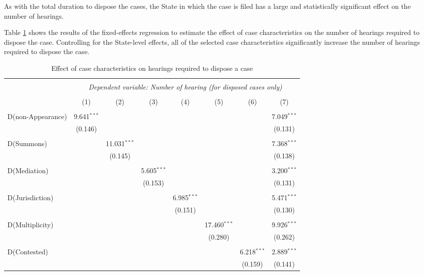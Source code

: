 As with the total duration to dispose the cases, the State in which the case is filed has a large and statistically significant effect on the number of hearings. 


Table \ref{tab:hearings_regression} shows the results of the fixed-effects regression to estimate the effect of case characteristics on the number of hearings required to dispose the case. Controlling for the State-level effects, all of the selected case characteristics significantly increase the number of hearings required to dispose the case.

{\footnotesize
 \begin{longtable}{lccccccc}
 \caption{Effect of case characteristics on hearings required to dispose a case}\label{tab:hearings_regression}\\
 \\[-1.8ex]
 \hline \\[-1.8ex] 
 & \multicolumn{7}{c}{\textit{Dependent variable: Number of hearing (for disposed cases only)}} \\ 
 \cline{2-8} 
 \\[-1.8ex] & (1) & (2) & (3) & (4) & (5) & (6) & (7)\\ 
 \hline \\[-1.8ex]
 D(non-Appearance) & 9.641$^{***}$ & & & & & & 7.049$^{***}$ \\ 
 & (0.146) & & & & & & (0.131) \\ 
 & & & & & & & \\ 
 D(Summons) & & 11.031$^{***}$ & & & & & 7.368$^{***}$ \\ 
 & & (0.145) & & & & & (0.138) \\ 
 & & & & & & & \\ 
 D(Mediation) & & & 5.605$^{***}$ & & & & 3.200$^{***}$ \\ 
 & & & (0.153) & & & & (0.131) \\ 
 & & & & & & & \\ 
 D(Jurisdiction) & & & & 6.985$^{***}$ & & & 5.471$^{***}$ \\ 
 & & & & (0.151) & & & (0.130) \\ 
 & & & & & & & \\ 
 D(Multiplicity) & & & & & 17.460$^{***}$ & & 9.926$^{***}$ \\ 
 & & & & & (0.280) & & (0.262) \\ 
 & & & & & & & \\ 
 D(Contested) & & & & & & 6.218$^{***}$ & 2.889$^{***}$ \\ 
 & & & & & & (0.159) & (0.141) \\ 

\end{longtable}}
